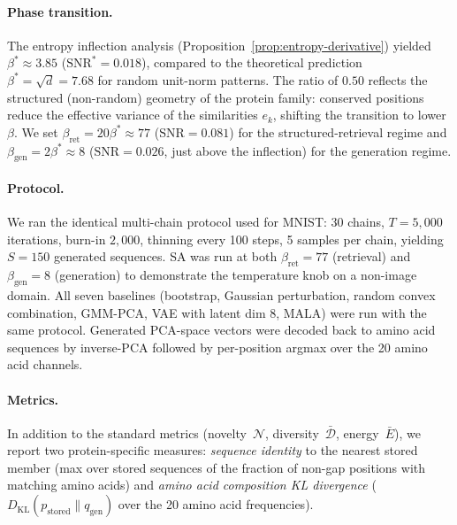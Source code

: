 \paragraph{Phase transition.}
The entropy inflection analysis (Proposition~\ref{prop:entropy-derivative}) yielded $\beta^*\approx 3.85$ ($\mathrm{SNR}^*=0.018$), compared to the theoretical prediction $\beta^*=\sqrt{d}=7.68$ for random unit-norm patterns. The ratio of $0.50$ reflects the structured (non-random) geometry of the protein family: conserved positions reduce the effective variance of the similarities $e_k$, shifting the transition to lower $\beta$. We set $\beta_{\mathrm{ret}}=20\beta^*\approx 77$ ($\mathrm{SNR}=0.081$) for the structured-retrieval regime and $\beta_{\mathrm{gen}}=2\beta^*\approx 8$ ($\mathrm{SNR}=0.026$, just above the inflection) for the generation regime.

\paragraph{Protocol.}
We ran the identical multi-chain protocol used for MNIST: 30 chains, $T{=}5{,}000$ iterations, burn-in $2{,}000$, thinning every 100 steps, 5 samples per chain, yielding $S{=}150$ generated sequences. SA was run at both $\beta_{\mathrm{ret}}{=}77$ (retrieval) and $\beta_{\mathrm{gen}}{=}8$ (generation) to demonstrate the temperature knob on a non-image domain. All seven baselines (bootstrap, Gaussian perturbation, random convex combination, GMM-PCA, VAE with latent dim 8, MALA) were run with the same protocol. Generated PCA-space vectors were decoded back to amino acid sequences by inverse-PCA followed by per-position argmax over the 20 amino acid channels.

\paragraph{Metrics.}
In addition to the standard metrics (novelty~$\mathcal{N}$, diversity~$\bar{\mathcal{D}}$, energy~$\bar{E}$), we report two protein-specific measures: \emph{sequence identity} to the nearest stored member (max over stored sequences of the fraction of non-gap positions with matching amino acids) and \emph{amino acid composition KL divergence} ($D_{\mathrm{KL}}(p_{\mathrm{stored}}\|q_{\mathrm{gen}})$ over the 20 amino acid frequencies).

